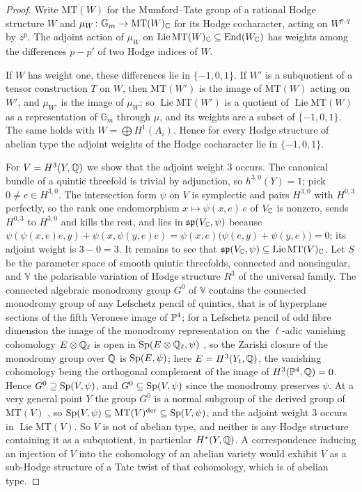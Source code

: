 \begin{proof}
Write $\mathrm{MT}(W)$ for the Mumford--Tate group of a rational Hodge
structure $W$ and $\mu_{W}\colon\mathbb{G}_{m}\to\mathrm{MT}(W)_{\mathbb{C}}$ for
its Hodge cocharacter, acting on $W^{p,q}$ by $z^{p}$. The adjoint action of
$\mu_{W}$ on $\operatorname{Lie}\mathrm{MT}(W)_{\mathbb{C}}\subseteq\operatorname{End}(W_{\mathbb{C}})$ has weights
among the differences $p-p'$ of two Hodge indices of $W$.

If $W$ has weight one, these differences lie in $\{-1,0,1\}$. If $W'$ is a
subquotient of a tensor construction $T$ on $W$, then $\mathrm{MT}(W')$ is the
image of $\mathrm{MT}(W)$ acting on $W'$, and $\mu_{W'}$ is the image of
$\mu_{W}$; so $\operatorname{Lie}\mathrm{MT}(W')$ is a quotient of $\operatorname{Lie}\mathrm{MT}(W)$
as a representation of $\mathbb{G}_{m}$ through $\mu$, and its weights are a
subset of $\{-1,0,1\}$. The same holds with $W=\bigoplus H^{1}(A_{i})$.
Hence for every Hodge structure of abelian type the adjoint weights of the
Hodge cocharacter lie in $\{-1,0,1\}$.

For $V=H^{3}(Y,\mathbb{Q})$ we show that the adjoint weight $3$ occurs. The
canonical bundle of a quintic threefold is trivial by adjunction, so
$h^{3,0}(Y)=1$; pick $0\ne e\in H^{3,0}$. The intersection form $\psi$ on $V$
is symplectic and pairs $H^{3,0}$ with $H^{0,3}$ perfectly, so the rank one
endomorphism $x\mapsto\psi(x,e)\,e$ of $V_{\mathbb{C}}$ is nonzero, sends $H^{0,3}$
to $H^{3,0}$ and kills the rest, and lies in $\mathfrak{sp}(V_{\mathbb{C}},\psi)$
because $\psi(\psi(x,e)e,y)+\psi(x,\psi(y,e)e)
=\psi(x,e)\bigl(\psi(e,y)+\psi(y,e)\bigr)=0$; its adjoint weight is
$3-0=3$. It remains to see that $\mathfrak{sp}(V_{\mathbb{C}},\psi)\subseteq
\operatorname{Lie}\mathrm{MT}(V)_{\mathbb{C}}$. Let $S$ be the parameter space of smooth quintic
threefolds, connected and nonsingular, and $\mathbb{V}$ the polarisable
variation of Hodge structure $R^{3}$ of the universal family. The connected
algebraic monodromy group $G^{0}$ of $\mathbb{V}$ contains the connected
monodromy group of any Lefschetz pencil of quintics, that is of hyperplane
sections of the fifth Veronese image of $\mathbb{P}^{4}$; for a Lefschetz pencil of
odd fibre dimension the image of the monodromy representation on the
$\ell$-adic vanishing cohomology $E\otimes\mathbb{Q}_{\ell}$ is open in
$\operatorname{Sp}(E\otimes\mathbb{Q}_{\ell},\psi)$ \cite[Theorem 5.10]{Del74}, so the Zariski
closure of the monodromy group over $\mathbb{Q}$ is $\operatorname{Sp}(E,\psi)$; here
$E=H^{3}(Y_{t},\mathbb{Q})$, the vanishing cohomology being the orthogonal
complement of the image of $H^{3}(\mathbb{P}^{4},\mathbb{Q})=0$. Hence $G^{0}\supseteq
\operatorname{Sp}(V,\psi)$, and $G^{0}\subseteq\operatorname{Sp}(V,\psi)$ since the monodromy preserves
$\psi$. At a very general
point $Y$ the group $G^{0}$ is a normal subgroup of the derived group of
$\mathrm{MT}(V)$ \cite[Theorem 1]{And92}, so $\operatorname{Sp}(V,\psi)\subseteq
\mathrm{MT}(V)^{\mathrm{der}}\subseteq\operatorname{Sp}(V,\psi)$, and the adjoint weight
$3$ occurs in $\operatorname{Lie}\mathrm{MT}(V)$. So $V$ is not of abelian type, and
neither is any Hodge structure containing it as a subquotient, in particular
$H^{*}(Y,\mathbb{Q})$. A correspondence inducing an injection of $V$ into the
cohomology of an abelian variety would exhibit $V$ as a sub-Hodge structure
of a Tate twist of that cohomology, which is of abelian type.
\end{proof}

